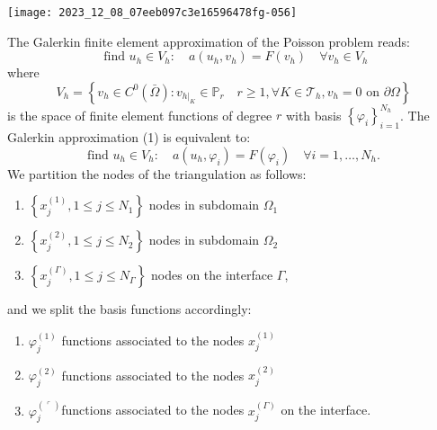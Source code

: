 \documentclass[11pt]{book}
\begin{document}
\begin{center}
\texttt{[image: 2023\_12\_08\_07eeb097c3e16596478fg-056]}
\end{center}
The Galerkin finite element approximation of the Poisson problem reads:
\begin{equation}
    \text { find } u_{h} \in V_{h}: \quad a\left(u_{h}, v_{h}\right)=F\left(v_{h}\right) \quad \forall v_{h} \in V_{h}
\end{equation}
where
$$
V_{h}=\left\{v_{h} \in C^{0}(\bar{\Omega}): v_{\left.h\right|_{K}} \in \mathbb{P}_{r} \quad r \geq 1, \forall K \in \mathcal{T}_{h}, v_{h}=0 \text { on } \partial \Omega\right\}
$$
is the space of finite element functions of degree $r$ with basis $\left\{\varphi_{i}\right\}_{i=1}^{N_{h}}$.
The Galerkin approximation (1) is equivalent to:
\begin{equation}
\text { find } u_{h} \in V_{h}: \quad a\left(u_{h}, \varphi_{i}\right)=F\left(\varphi_{i}\right) \quad \forall i=1, \ldots, N_{h} \text {. }
\end{equation}
We partition the nodes of the triangulation as follows:
\begin{enumerate}
  \item $\left\{x_{j}^{(1)}, 1 \leq j \leq N_{1}\right\}$ nodes in subdomain $\Omega_{1}$
  \item $\left\{x_{j}^{(2)}, 1 \leq j \leq N_{2}\right\}$ nodes in subdomain $\Omega_{2}$
  \item $\left\{x_{j}^{(\Gamma)}, 1 \leq j \leq N_{\Gamma}\right\}$ nodes on the interface $\Gamma$,
\end{enumerate}
and we split the basis functions accordingly:
\begin{enumerate}
  \item $\varphi_{j}^{(1)}$ functions associated to the nodes $x_{j}^{(1)}$
  \item $\varphi_{j}^{(2)}$ functions associated to the nodes $x_{j}^{(2)}$
  \item $\varphi_{j}^{(\ulcorner)}$functions associated to the nodes $x_{j}^{(\Gamma)}$ on the interface.
\end{enumerate}
\end{document}
